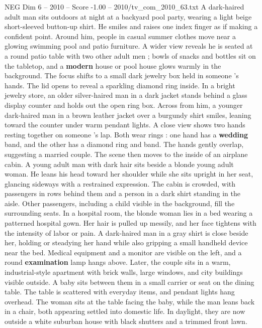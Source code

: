 \begin{textsample}{NEG Dim 6 – 2010 – Score -1.00 – 2010/tv\_com\_2010\_63.txt}  \label{ex:f6_neg_013}
A dark-haired adult man sits outdoors at night at a backyard pool party, wearing a light beige short-sleeved button-up shirt.
He smiles and raises one index finger as if making a confident point.
Around him, people in casual summer clothes move near a glowing swimming pool and patio furniture.
A wider view reveals he is seated at a round patio table with two other adult men ; bowls of snacks and bottles sit on the tabletop, and a \textbf{modern} house or pool house glows warmly in the background.
The focus shifts to a small dark jewelry box held in someone ’s hands.
The lid opens to reveal a sparkling diamond ring inside.
In a bright jewelry store, an older silver-haired man in a dark jacket stands behind a glass display counter and holds out the open ring box.
Across from him, a younger dark-haired man in a brown leather jacket over a burgundy shirt smiles, leaning toward the counter under warm pendant lights.
A close view shows two hands resting together on someone ’s lap.
Both wear rings : one hand has a \textbf{wedding} band, and the other has a diamond ring and band.
The hands gently overlap, suggesting a married couple.
The scene then moves to the inside of an airplane cabin.
A young adult man with dark hair sits beside a blonde young adult woman.
He leans his head toward her shoulder while she sits upright in her seat, glancing sideways with a restrained expression.
The cabin is crowded, with passengers in rows behind them and a person in a dark shirt standing in the aisle.
Other passengers, including a child visible in the background, fill the surrounding seats.
In a hospital room, the blonde woman lies in a bed wearing a patterned hospital gown.
Her hair is pulled up messily, and her face tightens with the intensity of labor or pain.
A dark-haired man in a gray shirt is close beside her, holding or steadying her hand while also gripping a small handheld device near the bed.
Medical equipment and a monitor are visible on the left, and a round \textbf{examination} lamp hangs above.
Later, the couple sits in a warm, industrial-style apartment with brick walls, large windows, and city buildings visible outside.
A baby sits between them in a small carrier or seat on the dining table.
The table is scattered with everyday items, and pendant lights hang overhead.
The woman sits at the table facing the baby, while the man leans back in a chair, both appearing settled into domestic life.
In daylight, they are now outside a white suburban house with black shutters and a trimmed front lawn.

\end{textsample}

